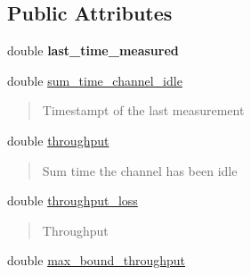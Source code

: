 \subsection*{Public Attributes}
\begin{DoxyCompactItemize}
\item 
\mbox{\label{structPerformance_a9d13a742de56d0319a7e374849e3f76e}} 
double {\bfseries last\+\_\+time\+\_\+measured}
\item 
\mbox{\label{structPerformance_a19af102ae270340143c633357abd64a7}} 
double \hyperlink{structPerformance_a19af102ae270340143c633357abd64a7}{sum\+\_\+time\+\_\+channel\+\_\+idle}
\begin{DoxyCompactList}\small\item\em \begin{quote}
Timestampt of the last measurement \end{quote}
\end{DoxyCompactList}\item 
\mbox{\label{structPerformance_a620b1cd3e1f8258c41363816a99e8e80}} 
double \hyperlink{structPerformance_a620b1cd3e1f8258c41363816a99e8e80}{throughput}
\begin{DoxyCompactList}\small\item\em \begin{quote}
Sum time the channel has been idle \end{quote}
\end{DoxyCompactList}\item 
\mbox{\label{structPerformance_a4d5736665c769c16c800e1f1370dd30f}} 
double \hyperlink{structPerformance_a4d5736665c769c16c800e1f1370dd30f}{throughput\+\_\+loss}
\begin{DoxyCompactList}\small\item\em \begin{quote}
Throughput \end{quote}
\end{DoxyCompactList}\item 
\mbox{\label{structPerformance_a8c7c0b2d5b16f0d926625c6eba52bb47}} 
double \hyperlink{structPerformance_a8c7c0b2d5b16f0d926625c6eba52bb47}{max\+\_\+bound\+\_\+throughput}
\begin{DoxyCompactList}\small\item\em \begin{quote}

\end{quote}
\end{DoxyCompactList}
\end{DoxyCompactItemize}
